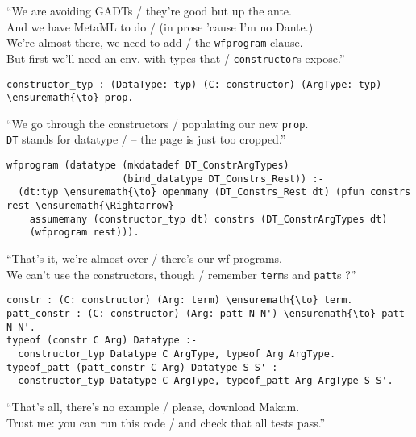 \begin{versy}
``We are avoiding GADTs / they're good but up the ante. \\
And we have MetaML to do / (in prose 'cause I'm no Dante.) \\
We're almost there, we need to add / the \texttt{wfprogram} clause. \\
But first we'll need an env. with types that / \texttt{constructor}s expose.''
\end{versy}

\begin{verbatim}
constructor_typ : (DataType: typ) (C: constructor) (ArgType: typ) \ensuremath{\to} prop.
\end{verbatim}

\begin{versy}
``We go through the constructors / populating our new \texttt{prop}. \\
\texttt{DT} stands for datatype / -- the page is just too cropped.''
\end{versy}

\begin{verbatim}
wfprogram (datatype (mkdatadef DT_ConstrArgTypes)
                    (bind_datatype DT_Constrs_Rest)) :-
  (dt:typ \ensuremath{\to} openmany (DT_Constrs_Rest dt) (pfun constrs rest \ensuremath{\Rightarrow}
    assumemany (constructor_typ dt) constrs (DT_ConstrArgTypes dt)
    (wfprogram rest))).
\end{verbatim}

\begin{versy}
``That's it, we're almost over / there's our wf-programs. \\
We can't use the constructors, though / remember \texttt{term}s and \texttt{patt}s ?''
\end{versy}

\begin{verbatim}
constr : (C: constructor) (Arg: term) \ensuremath{\to} term.
patt_constr : (C: constructor) (Arg: patt N N') \ensuremath{\to} patt N N'.
typeof (constr C Arg) Datatype :-
  constructor_typ Datatype C ArgType, typeof Arg ArgType.
typeof_patt (patt_constr C Arg) Datatype S S' :-
  constructor_typ Datatype C ArgType, typeof_patt Arg ArgType S S'.
\end{verbatim}

\begin{versy}
``That's all, there's no example / please, download Makam. \\
Trust me: you can run this code / and check that all tests pass.''
\end{versy}
